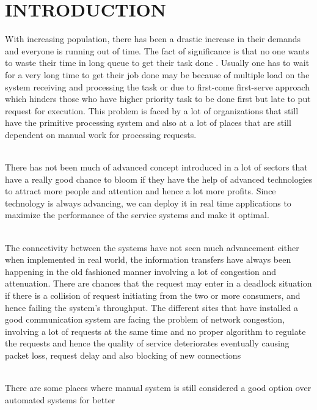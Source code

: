 \documentclass[12pt,a4paper]{report}
\begin{document}
\chapter{INTRODUCTION}
\hspace{0.25cm}
\par
 With increasing population, there has been a drastic
increase in their demands and everyone is running out of
time. The fact of significance is that no one wants to waste
their time in long queue to get their task done . Usually one
has to wait for a very long time to get their job done may be
because of multiple load on the system receiving and
processing the task or due to first-come first-serve approach
which hinders those who have higher priority task to be
done first but late to put request for execution. This
problem is faced by a lot of organizations that still have the
primitive processing system and also at a lot of places that
are still dependent on manual work for processing requests.
\\
\\
\par
There has not been much of advanced concept introduced in a
lot of sectors that have a really good chance to bloom if
they have the help of advanced technologies to attract more
people and attention and hence a lot more profits. Since
technology is always advancing, we can deploy it in real
time applications to maximize the performance of the
service systems and make it optimal.
\\
\\
\par
The connectivity between the systems have not seen
much advancement either when implemented in real world,
the information transfers have always been happening in
the old fashioned manner involving a lot of congestion and
attenuation. There are chances that the request may enter in
a deadlock situation if there is a collision of request
initiating from the two or more consumers, and hence
failing the system's throughput. The different sites that
have installed a good communication system are facing the
problem of network congestion, involving a lot of requests
at the same time and no proper algorithm to regulate the
requests and hence the quality of service deteriorates
eventually causing packet loss, request delay and also
blocking of new connections 
\\
\\
\par
There are some places where manual system is still
considered a good option over automated systems for better
\end{document}
